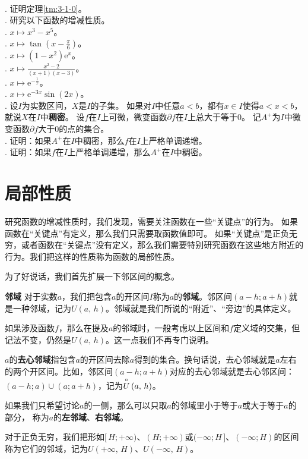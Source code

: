 \documentclass[12pt,UTF8,fontset=none]{ctexbook}
\begin{document}
\begin{xt}
    \mbox{} \\
    . 证明定理\ref{tm:3-1-0}。\\
    . 研究以下函数的增减性质。\\
    . $x\mapsto x^3 - x^5$。\\
    . $x\mapsto \tan{\left(x - \frac{\pi}{6}\right)}$。\\
    . $x\mapsto (1 - x^2) \mathrm{e}^x$。\\
    . $x\mapsto \frac{x^2 - 2}{(x + 1)(x - 3)}$。\\
    . $x\mapsto \mathrm{e}^{-\frac{1}{x}}$。\\
    . $x\mapsto \mathrm{e}^{-3x} \sin{(2x)}$。\\
    . 设$I$为实数区间，$X$是$I$的子集。
    如果对$I$中任意$a < b$，都有$x\in I$使得$a<x<b$，就说$X$在$I$中\textbf{稠密}。
    设$f$在$I$上可微，微变函数$\partial f$在$I$上总大于等于$0$。
    记$A^+$为$I$中微变函数$\partial f$大于$0$的点的集合。\\
    . 证明：如果$A^+$在$I$中稠密，那么$f$在$I$上严格单调递增。\\
    . 证明：如果$f$在$I$上严格单调递增，那么$A^+$在$I$中稠密。
    
\end{xt}


 \section{局部性质}

研究函数的增减性质时，我们发现，需要关注函数在一些“关键点”的行为。
如果函数在“关键点”有定义，那么我们只需要取函数值即可。
如果“关键点”是正负无穷，或者函数在“关键点”没有定义，那么我们需要特别研究函数在这些地方附近的行为。我们把这样的性质称为函数的局部性质。

为了好说话，我们首先扩展一下邻区间的概念。
\begin{df}{\textbf{邻域}}
    对于实数$a$，我们把包含$a$的开区间$I$称为$a$的\textbf{邻域}。邻区间$(a-h; a+h)$就是一种邻域，记为$U(a,\,h)$。邻域就是我们所说的“附近”、“旁边”的具体定义。

    如果涉及函数$f$，那么在提及$a$的邻域时，一般考虑以上区间和$f$定义域的交集，但记法不变，仍然是$U(a,\,h)$。这一点我们不再专门说明。

    $a$的\textbf{去心邻域}指包含$a$的开区间去除$a$得到的集合。换句话说，去心邻域就是$a$左右的两个开区间。比如，邻区间$(a-h; a+h)$对应的去心邻域就是去心邻区间：$(a-h; a)\cup(a; a+h)$，记为$\overset{\circ}{U}\left(a,\,h\right)$。
    
    如果我们只希望讨论$a$的一侧，那么可以只取$a$的邻域里小于等于$a$或大于等于$a$的部分，
    称为$a$的\textbf{左邻域}、\textbf{右邻域}。

    对于正负无穷，我们把形如$[\,H; +\infty)$、$(H; +\infty)$或$(-\infty; H\,]$、$(-\infty; H)$的区间称为它们的邻域，记为$U(+\infty,\,H)$、$U(-\infty,\,H)$。
\end{df}
\end{document}
